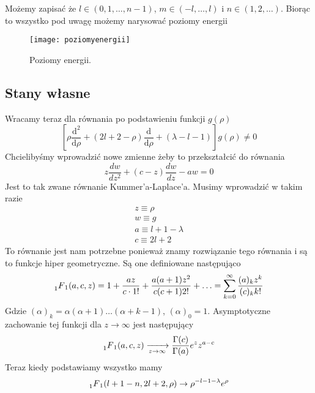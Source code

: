 Możemy zapisać że $ l\in(0,1,\ldots,n-1) $, $ m\in(-l,\ldots,l) $ i $n\in(1, 2, \dotsc)$. Biorąc to wszystko pod uwagę możemy narysować poziomy energii
\begin{figure}[H]
	\centering
	\texttt{[image: poziomyenergii]}
	\caption{Poziomy energii.}
	\label{fig:poziomyenergii}
\end{figure}
\subsection{Stany własne}
Wracamy teraz dla równania po podstawieniu funkcji $g(\rho)$
\begin{equation*}
	\left[\rho\frac{\text{d}^{2}}{\text{d} \rho}+(2l + 2 - \rho)\frac{\text{d}}{\text{d} \rho} + (\lambda - l - 1)\right] g(\rho)\neq0
\end{equation*}
Chcielibyśmy wprowadzić nowe zmienne żeby to przekształcić do równania
\begin{equation*}
	z \frac{d w}{d z^{2}}+(c-z) \frac{d w}{d z}-a w=0 
\end{equation*}
Jest to tak zwane równanie Kummer'a-Laplace'a. Musimy wprowadzić w takim razie
\begin{equation*}
	\begin{gathered}
		z \equiv \rho \\
		w \equiv g \\
		a \equiv l + 1 - \lambda \\
		c \equiv 2l + 2
	\end{gathered}
\end{equation*}
To równanie jest nam potrzebne ponieważ znamy rozwiązanie tego równania i są to funkcje hiper geometryczne. Są one definiowane następująco
\begin{equation*}
	\prescript{}{1}{F}_{1}(a, c, z)=1+\frac{a z}{c\cdot1!}+\frac{a(a+1) z^{2}}{c(c+1) 2!}+\ldots=\sum_{k=0}^{\infty} \frac{(a)_{k} z^{k}}{(c)_{k} k!}
\end{equation*}
Gdzie $(\alpha)_k = \alpha (\alpha+1)\dotsc(\alpha+k-1)$, $(\alpha)_0=1$. Asymptotyczne zachowanie tej funkcji dla $z \to \infty$ jest następujący
\begin{equation*}
	\prescript{}{1}{F}_{1}(a, c, z) \xrightarrow[z \to \infty]{} \frac{\Gamma(c)}{\Gamma(a)}e^z z^{a-c}
\end{equation*}
Teraz kiedy podstawiamy wszystko mamy
\begin{equation*}
	\prescript{}{1}{F}_{1}(l + 1 - n, 2l+2, \rho) \rightarrow \rho^{-l-1-\lambda} e^{\rho}
\end{equation*}
